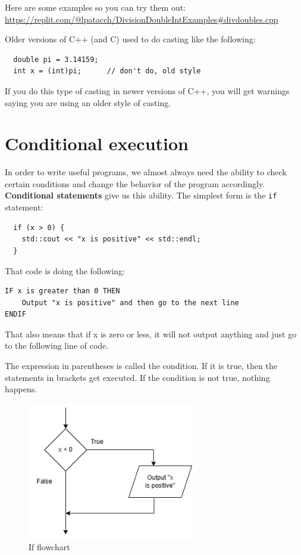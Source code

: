 Here are some examples so you can try them out: \url{https://replit.com/@lpatacch/DivisionDoubleIntExamples#divdoubles.cpp }

Older versions of C++ (and C) used to do casting like the following:
\begin{lstlisting}
  double pi = 3.14159;
  int x = (int)pi;      // don't do, old style
\end{lstlisting}
If you do this type of casting in newer versions of C++, you will get warnings
saying you are using an older style of casting.

\section{Conditional execution}

In order to write useful programs, we almost always need the ability to check certain conditions and change the behavior of the program accordingly.  {\bf Conditional statements} give us this ability.  The simplest form is the {\tt if} statement:

\begin{lstlisting}
  if (x > 0) {
    std::cout << "x is positive" << std::endl;
  }
\end{lstlisting}
%
That code is doing the following:
\begin{verbatim}
IF x is greater than 0 THEN
    Output "x is positive" and then go to the next line
ENDIF
\end{verbatim}
That also means that if x is zero or less, it will not output anything and just go to the following line of code. 

The expression in parentheses is called the condition.
If it is true, then the statements in brackets get executed.
If the condition is not true, nothing happens.

\begin{figure}[h]
    \centering
    \includegraphics[height=6cm]{images/ifflow.png}
    \caption{If flowchart}
    \label{fig:ifflow}
\end{figure}

